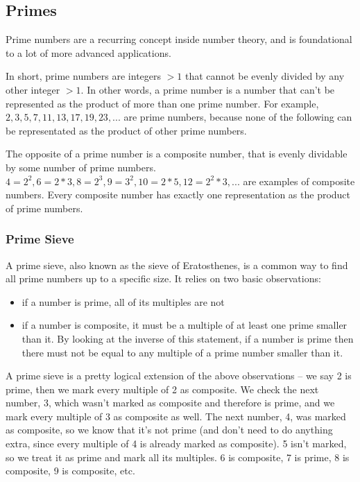 \subsection{Primes}

Prime numbers are a recurring concept inside number theory, and is foundational to a lot of more advanced applications.

In short, prime numbers are integers $> 1$ that cannot be evenly divided by any other integer $> 1$. In other words, a prime number is a number that can't be represented as the product of more than one prime number. For example, $2, 3, 5, 7, 11, 13, 17, 19, 23, ...$ are prime numbers, because none of the following can be representated as the product of other prime numbers.

The opposite of a prime number is a composite number, that is evenly dividable by some number of prime numbers. $4 = 2^2, 6 = 2*3, 8 = 2^3, 9 = 3^2, 10 = 2*5, 12 = 2^2*3, ...$ are examples of composite numbers. Every composite number has exactly one representation as the product of prime numbers.

\subsubsection{Prime Sieve}
 

A prime sieve, also known as the sieve of Eratosthenes, is a common way to find all prime numbers up to a specific size. It relies on two basic observations:
\begin{itemize}
\item if a number is prime, all of its multiples are not
\item if a number is composite, it must be a multiple of at least one prime smaller than it. By looking at the inverse of this statement, if a number is prime then there must not be equal to any multiple of a prime number smaller than it.
\end{itemize}

A prime sieve is a pretty logical extension of the above observations -- we say 2 is prime, then we mark every multiple of 2 as composite. We check the next number, 3, which wasn't marked as composite and therefore is prime, and we mark every multiple of 3 as composite as well. The next number, 4, was marked as composite, so we know that it's not prime (and don't need to do anything extra, since every multiple of 4 is already marked as composite). 5 isn't marked, so we treat it as prime and mark all its multiples. 6 is composite, 7 is prime, 8 is composite, 9 is composite, etc.


